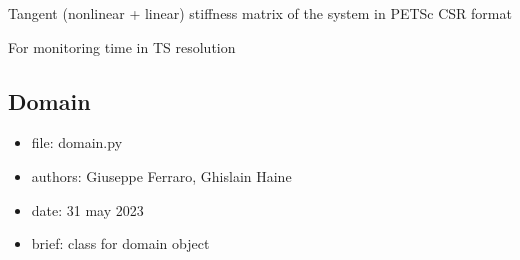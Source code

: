 \documentclass[letterpaper,10pt,english]{sphinxmanual}
\begin{document}
\begin{fulllineitems}
\begin{fulllineitems}
\label{\detokenize{scrimp:scrimp.dphs.DPHS.tangent_stiffness}}
\pysigstartsignatures
\pysigline
{}
\pysigstopsignatures
\sphinxAtStartPar
Tangent (non\sphinxhyphen{}linear + linear) stiffness matrix of the system in PETSc CSR format

\end{fulllineitems}


\begin{fulllineitems}
\label{\detokenize{scrimp:scrimp.dphs.DPHS.ts_start}}
\pysigstartsignatures
\pysigline
{}
\pysigstopsignatures
\sphinxAtStartPar
For monitoring time in TS resolution

\end{fulllineitems}


\end{fulllineitems}



\subsection{Domain}
\label{\detokenize{scrimp:module-scrimp.domain}}\label{\detokenize{scrimp:domain}}\begin{itemize}
\item {} 
\sphinxAtStartPar
file:             domain.py

\item {} 
\sphinxAtStartPar
authors:          Giuseppe Ferraro, Ghislain Haine

\item {} 
\sphinxAtStartPar
date:             31 may 2023

\item {} 
\sphinxAtStartPar
brief:            class for domain object

\end{itemize}
\end{document}
